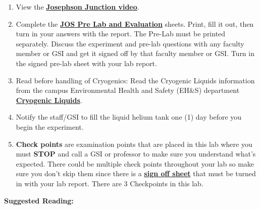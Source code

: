 \documentclass{../lab}
\begin{document}
\begin{enumerate}
    \item View the \href{http://youtu.be/Z9vBPQrG0U4}{\textbf{Josephson Junction video}}.

    \item Complete the \href{http://experimentationlab.berkeley.edu/JOSPreLab}{\textbf{JOS Pre Lab and Evaluation}} sheets. Print, fill it out, then turn in your answers with the report. The Pre-Lab must be printed separately. Discuss the experiment and pre-lab questions with any faculty member or GSI and get it signed off by that faculty member or GSI. Turn in the signed pre-lab sheet with your lab report.

    \item Read before handling of Cryogenics: Read the Cryogenic Liquids information from the campus Environmental Health and Safety (EH\&S) department \href{http://experimentationlab.berkeley.edu/sites/default/files/SHE/77cryogenic.pdf}{\textbf{Cryogenic Liquids}}.

    \item Notify the staff/GSI to fill the liquid helium tank one (1) day before you begin the experiment.

    \item \textbf{Check points} are examination points that are placed in this lab where you must \textbf{STOP} and call a GSI or professor to make sure you understand what's expected. There could  be multiple check points throughout your lab so make sure you don't skip them since there is a \href{http://experimentationlab.berkeley.edu/checkpointjso}{\textbf{\textbf{sign off sheet}}} that must be turned in with your lab report. There are 3 Checkpoints in this lab.

\end{enumerate}

\noindent\textbf{Suggested Reading:}
\end{document}

